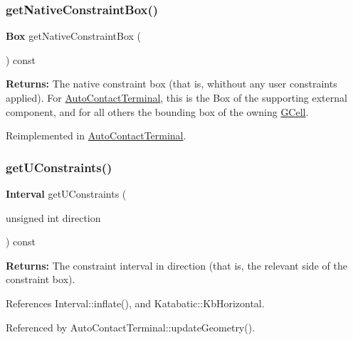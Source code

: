 \subsubsection{\texorpdfstring{get\+Native\+Constraint\+Box()}{getNativeConstraintBox()}}
{\footnotesize\ttfamily \textbf{ Box} get\+Native\+Constraint\+Box (\begin{DoxyParamCaption}{ }\end{DoxyParamCaption}) const\hspace{0.3cm}{\ttfamily [virtual]}}

{\bfseries Returns\+:} The native constraint box (that is, whithout any user constraints applied). For \mbox{\hyperlink{classKatabatic_1_1AutoContactTerminal}{Auto\+Contact\+Terminal}}, this is the Box of the supporting external component, and for all others the bounding box of the owning \mbox{\hyperlink{classKatabatic_1_1GCell}{G\+Cell}}. 

Reimplemented in \mbox{\hyperlink{classKatabatic_1_1AutoContactTerminal_a00ed934305dd186a284b7a13b5798cb6}{Auto\+Contact\+Terminal}}.

\mbox{\label{classKatabatic_1_1AutoContact_ab1fd3fec6dd56d40217b8a5ecacb1719}} 
\subsubsection{\texorpdfstring{get\+U\+Constraints()}{getUConstraints()}}
{\footnotesize\ttfamily \textbf{ Interval} get\+U\+Constraints (\begin{DoxyParamCaption}\item[{unsigned int}]{direction }\end{DoxyParamCaption}) const}

{\bfseries Returns\+:} The constraint interval in {\ttfamily direction} (that is, the relevant side of the constraint box). 

References Interval\+::inflate(), and Katabatic\+::\+Kb\+Horizontal.



Referenced by Auto\+Contact\+Terminal\+::update\+Geometry().

\mbox{\label{classKatabatic_1_1AutoContact_a347244bd3f3a59881a2dee9801c74618}} 
